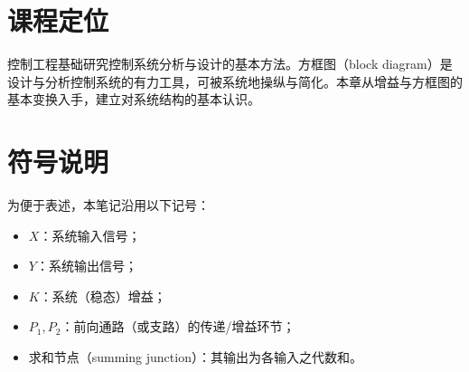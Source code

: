 \section{课程定位}
控制工程基础研究控制系统分析与设计的基本方法。方框图（block diagram）是设计与分析控制系统的有力工具，可被系统地操纵与简化。本章从增益与方框图的基本变换入手，建立对系统结构的基本认识。

\section{符号说明}
为便于表述，本笔记沿用以下记号：
\begin{itemize}
	\item $X$：系统输入信号；
	\item $Y$：系统输出信号；
	\item $K$：系统（稳态）增益；
	\item $P_1,P_2$：前向通路（或支路）的传递/增益环节；
	\item 求和节点（summing junction）：其输出为各输入之代数和。
\end{itemize}

